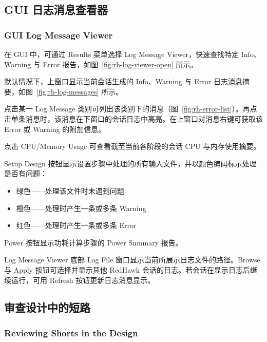 \subsection{GUI 日志消息查看器}
\subsubsection*{GUI Log Message Viewer}

在 GUI 中，可通过 Results 菜单选择 Log Message Viewer，快速查找特定 Info、Warning 与 Error 报告，如图~\ref{fig:rh-log-viewer-open} 所示。

\label{fig:rh-log-viewer-open}

默认情况下，上窗口显示当前会话生成的 Info、Warning 与 Error 日志消息摘要，如图~\ref{fig:rh-log-messages} 所示。

点击某一 Log Message 类别可列出该类别下的消息（图~\ref{fig:rh-error-list}）。再点击单条消息时，该消息在下窗口的会话日志中高亮。在上窗口对消息右键可获取该 Error 或 Warning 的附加信息。

点击 CPU/Memory Usage 可查看截至当前各阶段的会话 CPU 与内存使用摘要。

Setup Design 按钮显示设置步骤中处理的所有输入文件，并以颜色编码标示处理是否有问题：
\begin{itemize}
  \item 绿色——处理该文件时未遇到问题
  \item 橙色——处理时产生一条或多条 Warning
  \item 红色——处理时产生一条或多条 Error
\end{itemize}

\label{fig:rh-log-messages}

Power 按钮显示功耗计算步骤的 Power Summary 报告。

Log Message Viewer 底部 Log File 窗口显示当前所展示日志文件的路径。Browse 与 Apply 按钮可选择并显示其他 RedHawk 会话的日志。若会话在显示日志后继续运行，可用 Refresh 按钮更新日志消息显示。

\label{fig:rh-error-list}

\subsection{审查设计中的短路}
\subsubsection*{Reviewing Shorts in the Design}

